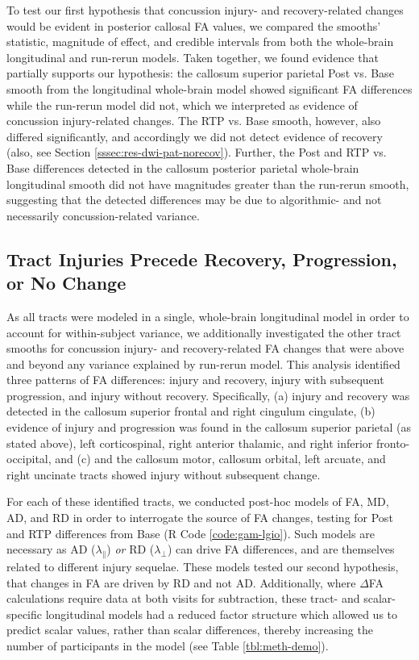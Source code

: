 \documentclass[12pt]{article}
\begin{document}
To test our first hypothesis that concussion injury- and recovery-related changes would be evident in posterior callosal FA values, we compared the smooths' statistic, magnitude of effect, and credible intervals from both the whole-brain longitudinal and run-rerun models. Taken together, we found evidence that partially supports our hypothesis: the callosum superior parietal Post vs. Base smooth from the longitudinal whole-brain model showed significant FA differences while the run-rerun model did not, which we interpreted as evidence of concussion injury-related changes. The RTP vs. Base smooth, however, also differed significantly, and accordingly we did not detect evidence of recovery (also, see Section \ref{sssec:res-dwi-pat-norecov}). Further, the Post and RTP vs. Base differences detected in the callosum posterior parietal whole-brain longitudinal smooth did not have magnitudes greater than the run-rerun smooth, suggesting that the detected differences may be due to algorithmic- and not necessarily concussion-related variance.


\subsection{Tract Injuries Precede Recovery, Progression, or No Change}
\label{ssec:res-dwi-pat}
As all tracts were modeled in a single, whole-brain longitudinal model in order to account for within-subject variance, we additionally investigated the other tract smooths for concussion injury- and recovery-related FA changes that were above and beyond any variance explained by run-rerun model. This analysis identified three patterns of FA differences: injury and recovery, injury with subsequent progression, and injury without recovery. Specifically, (a) injury and recovery was detected in the callosum superior frontal and right cingulum cingulate, (b) evidence of injury and progression was found in the callosum superior parietal (as stated above), left corticospinal, right anterior thalamic, and right inferior fronto-occipital, and (c) and the callosum motor, callosum orbital, left arcuate, and right uncinate tracts showed injury without subsequent change.

For each of these identified tracts, we conducted post-hoc models of FA, MD, AD, and RD in order to interrogate the source of FA changes, testing for Post and RTP differences from Base (R Code \ref{code:gam-lgio}). Such models are necessary as AD ($\lambda_\parallel$) \textit{or} RD ($\lambda_\perp$) can drive FA differences, and are themselves related to different injury sequelae. These models tested our second hypothesis, that changes in FA are driven by RD and not AD. Additionally, where $\Delta$FA calculations require data at both visits for subtraction, these tract- and scalar-specific longitudinal models had a reduced factor structure which allowed us to predict scalar values, rather than scalar differences, thereby increasing the number of participants in the model (see Table \ref{tbl:meth-demo}).
\end{document}
